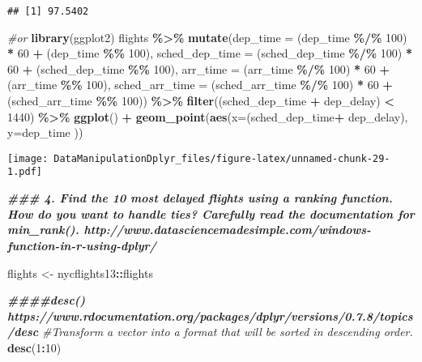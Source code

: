 \documentclass[
]{article}
\newenvironment{Shaded}{\begin{snugshade}}{\end{snugshade}}
\newcommand{\AttributeTok}[1]{\textcolor[rgb]{0.13,0.29,0.53}{#1}}
\newcommand{\CommentTok}[1]{\textcolor[rgb]{0.56,0.35,0.01}{\textit{#1}}}
\newcommand{\DecValTok}[1]{\textcolor[rgb]{0.00,0.00,0.81}{#1}}
\newcommand{\DocumentationTok}[1]{\textcolor[rgb]{0.56,0.35,0.01}{\textbf{\textit{#1}}}}
\newcommand{\FunctionTok}[1]{\textcolor[rgb]{0.13,0.29,0.53}{\textbf{#1}}}
\newcommand{\NormalTok}[1]{#1}
\newcommand{\OtherTok}[1]{\textcolor[rgb]{0.56,0.35,0.01}{#1}}
\newcommand{\SpecialCharTok}[1]{\textcolor[rgb]{0.81,0.36,0.00}{\textbf{#1}}}
\begin{document}
\begin{verbatim}
## [1] 97.5402
\end{verbatim}

\begin{Shaded}
\begin{Highlighting}[]
\CommentTok{\#or }
\FunctionTok{library}\NormalTok{(ggplot2)}
\NormalTok{flights }\SpecialCharTok{\%\textgreater{}\%}   \FunctionTok{mutate}\NormalTok{(}\AttributeTok{dep\_time =}\NormalTok{ (dep\_time }\SpecialCharTok{\%/\%} \DecValTok{100}\NormalTok{) }\SpecialCharTok{*} \DecValTok{60} \SpecialCharTok{+}\NormalTok{ (dep\_time }\SpecialCharTok{\%\%} \DecValTok{100}\NormalTok{),}
                       \AttributeTok{sched\_dep\_time =}\NormalTok{ (sched\_dep\_time }\SpecialCharTok{\%/\%} \DecValTok{100}\NormalTok{) }\SpecialCharTok{*} \DecValTok{60} \SpecialCharTok{+}\NormalTok{ (sched\_dep\_time }\SpecialCharTok{\%\%} \DecValTok{100}\NormalTok{),}
                       \AttributeTok{arr\_time =}\NormalTok{ (arr\_time }\SpecialCharTok{\%/\%} \DecValTok{100}\NormalTok{) }\SpecialCharTok{*} \DecValTok{60} \SpecialCharTok{+}\NormalTok{ (arr\_time }\SpecialCharTok{\%\%} \DecValTok{100}\NormalTok{),}
                       \AttributeTok{sched\_arr\_time =}\NormalTok{ (sched\_arr\_time }\SpecialCharTok{\%/\%} \DecValTok{100}\NormalTok{) }\SpecialCharTok{*} \DecValTok{60} \SpecialCharTok{+}\NormalTok{ (sched\_arr\_time }\SpecialCharTok{\%\%} \DecValTok{100}\NormalTok{)) }\SpecialCharTok{\%\textgreater{}\%}
                       \FunctionTok{filter}\NormalTok{((sched\_dep\_time }\SpecialCharTok{+}\NormalTok{ dep\_delay) }\SpecialCharTok{\textless{}} \DecValTok{1440}\NormalTok{) }\SpecialCharTok{\%\textgreater{}\%} 
                       \FunctionTok{ggplot}\NormalTok{() }\SpecialCharTok{+} 
                       \FunctionTok{geom\_point}\NormalTok{(}\FunctionTok{aes}\NormalTok{(}\AttributeTok{x=}\NormalTok{(sched\_dep\_time}\SpecialCharTok{+}\NormalTok{ dep\_delay), }\AttributeTok{y=}\NormalTok{dep\_time ))}
\end{Highlighting}
\end{Shaded}

\texttt{[image: DataManipulationDplyr\_files/figure-latex/unnamed-chunk-29-1.pdf]}

\begin{Shaded}
\begin{Highlighting}[]
\DocumentationTok{\#\#\# 4. Find the 10 most delayed flights using a ranking function. How do you want to handle ties? Carefully read the documentation for min\_rank(). http://www.datasciencemadesimple.com/windows{-}function{-}in{-}r{-}using{-}dplyr/}

\NormalTok{flights }\OtherTok{\textless{}{-}}\NormalTok{ nycflights13}\SpecialCharTok{::}\NormalTok{flights}

\DocumentationTok{\#\#\#\#desc()  https://www.rdocumentation.org/packages/dplyr/versions/0.7.8/topics/desc}
\CommentTok{\#Transform a vector into a format that will be sorted in descending order. }
\FunctionTok{desc}\NormalTok{(}\DecValTok{1}\SpecialCharTok{:}\DecValTok{10}\NormalTok{)}
\end{Highlighting}
\end{Shaded}
\end{document}
